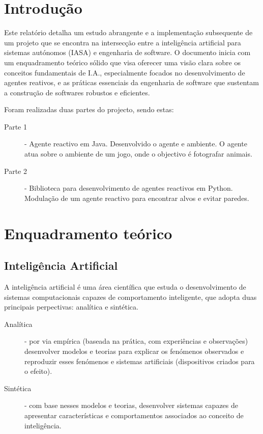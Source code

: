 \documentclass[a4paper,12pt]{article}
\begin{document}


\newpage
\tableofcontents

\newpage
\section{Introdução}
Este relatório detalha um estudo abrangente e a implementação subsequente de um projeto que se encontra na intersecção entre a inteligência artificial para sistemas autónomos (IASA) e engenharia de software. 
O documento inicia com um enquadramento teórico sólido que visa oferecer uma visão clara sobre os conceitos fundamentais de I.A., especialmente focados no desenvolvimento de agentes reativos, e as práticas essenciais da engenharia de software que sustentam a construção de softwares robustos e eficientes.

Foram realizadas duas partes do projecto, sendo estas:
\begin{description}
	\item[Parte 1] - Agente reactivo em Java. Desenvolvido o agente e ambiente. O agente atua sobre o ambiente de um jogo, onde o objectivo é fotografar animais.
	\item[Parte 2] - Biblioteca para desenvolvimento de agentes reactivos em Python. Modulação de um agente reactivo para encontrar alvos e evitar paredes.
\end{description}
\newpage
\section{Enquadramento teórico}
\subsection{Inteligência Artificial}
A inteligência artificial é uma área científica que estuda o desenvolvimento de sistemas computacionais capazes de comportamento inteligente, que adopta duas principais perpectivas: analítica e sintética.
\begin{description}
	\item[Analítica] - por via empírica (baseada na prática, com experiências e observações) desenvolver modelos e teorias para explicar os fenómenos observados e reproduzir esses fenómenos e sistemas artificiais (dispositivos criados para o efeito).
	\item[Sintética] - com base nesses modelos e teorias, desenvolver sistemas capazes de apresentar características e comportamentos associados ao conceito de inteligência.
\end{description}
\end{document}
